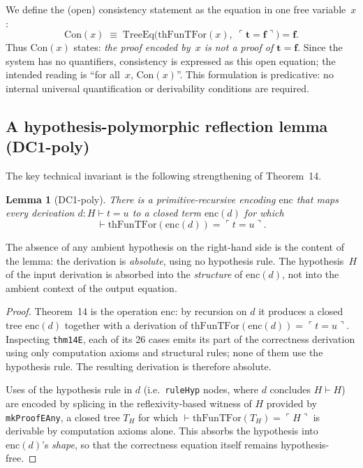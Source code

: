 \documentclass[11pt]{article}
\newtheorem{lemma}[theorem]{Lemma}
\newcommand{\trueT}{\mathbf{t}}
\newcommand{\falseT}{\mathbf{f}}
\newcommand{\code}[1]{\ulcorner #1 \urcorner}
\newcommand{\thFunTFor}{\mathrm{thFunTFor}}
\newcommand{\TreeEq}{\mathrm{TreeEq}}
\begin{document}
We define the (open) consistency statement as the equation in one
free variable~$x$:
\[
  \mathrm{Con}(x) \;\equiv\;
  \TreeEq\bigl(\thFunTFor(x),\;\code{\trueT = \falseT}\bigr) = \falseT.
\]
Thus $\mathrm{Con}(x)$ states: \emph{the proof encoded by~$x$ is
not a proof of $\trueT = \falseT$}.  Since the system has no
quantifiers, consistency is expressed as this open equation;
the intended reading is ``for all~$x$, $\mathrm{Con}(x)$''.
This formulation is predicative: no internal universal
quantification or derivability conditions are required.

\subsection{A hypothesis-polymorphic reflection lemma (DC1-poly)}

The key technical invariant is the following strengthening of
Theorem~14.

\begin{lemma}[DC1-poly]
\label{lem:dc1poly}
There is a primitive-recursive encoding $\mathrm{enc}$ that maps
every derivation $d : H \vdash t = u$ to a closed term
$\mathrm{enc}(d)$ for which
\[
  \vdash \thFunTFor(\mathrm{enc}(d)) = \code{t = u}.
\]
\end{lemma}

\noindent
The absence of any ambient hypothesis on the right-hand side is
the content of the lemma: the derivation is \emph{absolute},
using no hypothesis rule.  The hypothesis~$H$ of the input
derivation is absorbed into the \emph{structure} of
$\mathrm{enc}(d)$, not into the ambient context of the output
equation.

\begin{proof}
Theorem~14 is the operation $\mathrm{enc}$: by recursion on $d$
it produces a closed tree $\mathrm{enc}(d)$ together with a
derivation of $\thFunTFor(\mathrm{enc}(d)) = \code{t = u}$.
Inspecting \texttt{thm14E}, each of its 26 cases emits its part
of the correctness derivation using only computation axioms and
structural rules; none of them use the hypothesis rule.  The
resulting derivation is therefore absolute.

Uses of the hypothesis rule in $d$ (i.e.\ \texttt{ruleHyp}
nodes, where $d$ concludes $H \vdash H$) are encoded by splicing
in the reflexivity-based witness of $H$ provided by
\texttt{mkProofEAny}, a closed tree $T_H$ for which
$\vdash \thFunTFor(T_H) = \code{H}$ is derivable by computation
axioms alone.  This absorbs the hypothesis into
$\mathrm{enc}(d)$'s \emph{shape}, so that the correctness
equation itself remains hypothesis-free.
\end{proof}
\end{document}
